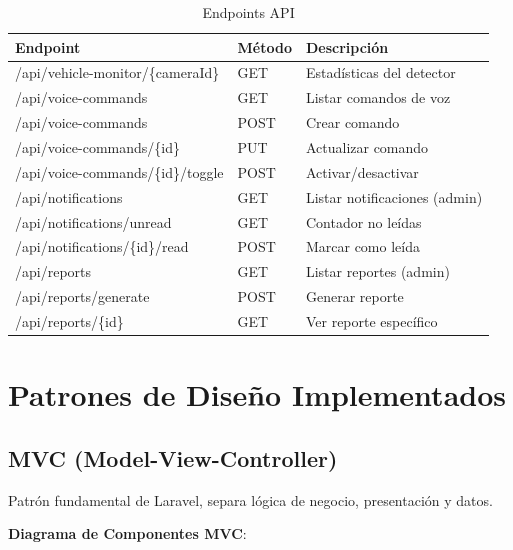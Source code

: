 \documentclass[12pt,a4paper]{article}
\begin{document}
\begin{table}[H]
\centering
\small
\begin{tabular}{|l|l|p{5cm}|}
\hline
\textbf{Endpoint} & \textbf{Método} & \textbf{Descripción} \\
\hline
/api/vehicle-monitor/\{cameraId\} & GET & Estadísticas del detector \\
\hline
/api/voice-commands & GET & Listar comandos de voz \\
/api/voice-commands & POST & Crear comando \\
/api/voice-commands/\{id\} & PUT & Actualizar comando \\
/api/voice-commands/\{id\}/toggle & POST & Activar/desactivar \\
\hline
/api/notifications & GET & Listar notificaciones (admin) \\
/api/notifications/unread & GET & Contador no leídas \\
/api/notifications/\{id\}/read & POST & Marcar como leída \\
\hline
/api/reports & GET & Listar reportes (admin) \\
/api/reports/generate & POST & Generar reporte \\
/api/reports/\{id\} & GET & Ver reporte específico \\
\hline
\end{tabular}
\caption{Endpoints API}
\end{table}

\newpage

\section{Patrones de Diseño Implementados}

\subsection{MVC (Model-View-Controller)}

Patrón fundamental de Laravel, separa lógica de negocio, presentación y datos.

\textbf{Diagrama de Componentes MVC}:
\end{document}
